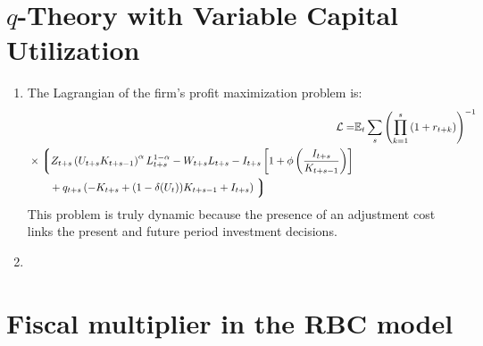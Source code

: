 \documentclass[11pt]{amsart}
\begin{document}
\section{$q$-Theory with Variable Capital Utilization}
\begin{enumerate}[label = (\alph*)]
	\item The Lagrangian of the firm's profit maximization problem is: 
	\begin{align*}
	\mathcal{L} =& \mathbb{E}_t \sum_{s} \left( \prod_{k=1}^{s} \left(1 + r_{t+k} \right) \right)^{-1} \\
	\begin{split}
	&\times \left\lgroup  Z_{t+s} \left( U_{t+s} K_{t+s-1}  \right)^{\alpha} L_{t+s}^{1-\alpha}  - W_{t+s} L_{t+s} - I_{t+s} \left[ 1 + \phi \left( \frac{I_{t+s}}{K_{t+s-1}} \right) \right] \right. \\
	& \qquad + q_{t+s} \left( -K_{t+s} + (1-\delta(U_t))K_{t+s-1} + I_{t+s} \right) \left. \right\rgroup
	\end{split}
	\end{align*}
	This problem is truly dynamic because the presence of an adjustment cost links the present and future period investment decisions. 
	\item 
\end{enumerate}
\section{Fiscal multiplier in the RBC model}
\end{document}
